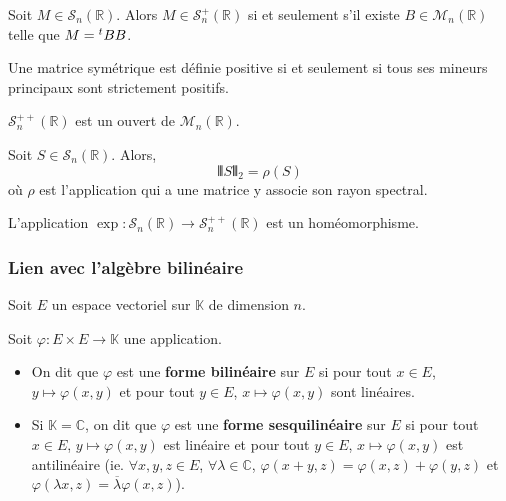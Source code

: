   \begin{corollary}
    Soit $M \in \mathcal{S}_n(\mathbb{R})$. Alors $M \in \mathcal{S}_n^+(\mathbb{R})$ si et seulement s'il existe $B \in \mathcal{M}_n(\mathbb{R})$ telle que $M = \mathstrut ^t BB$.
  \end{corollary}

  \begin{theorem}
    Une matrice symétrique est définie positive si et seulement si tous ses mineurs principaux sont strictement positifs.
  \end{theorem}

  \begin{corollary}
    $\mathcal{S}_n^{++}(\mathbb{R})$ est un ouvert de $\mathcal{M}_n(\mathbb{R})$.
  \end{corollary}


  \begin{lemma}
    Soit $S \in \mathcal{S}_n(\mathbb{R})$. Alors,
    \[ \VERT S \VERT_2 = \rho(S) \]
    où $\rho$ est l'application qui a une matrice y associe son rayon spectral.
  \end{lemma}


  \begin{theorem}
    L'application $\exp : \mathcal{S}_n(\mathbb{R}) \rightarrow \mathcal{S}^{++}_n(\mathbb{R})$ est un homéomorphisme.
  \end{theorem}

  \subsubsection{Lien avec l'algèbre bilinéaire}


  Soit $E$ un espace vectoriel sur $\mathbb{K}$ de dimension $n$.

  \begin{definition}
    Soit $\varphi : E \times E \rightarrow \mathbb{K}$ une application.
    \begin{itemize}
      \item On dit que $\varphi$ est une \textbf{forme bilinéaire} sur $E$ si pour tout $x \in E$, $y \mapsto \varphi(x, y)$ et pour tout $y \in E$, $x \mapsto \varphi(x, y)$ sont linéaires.
      \item Si $\mathbb{K} = \mathbb{C}$, on dit que $\varphi$ est une \textbf{forme sesquilinéaire} sur $E$ si pour tout $x \in E$, $y \mapsto \varphi(x, y)$ est linéaire et pour tout $y \in E$, $x \mapsto \varphi(x, y)$ est antilinéaire (ie. $\forall x, y, z \in E$, $\forall \lambda \in \mathbb{C}$, $\varphi(x+y, z) = \varphi(x,z) + \varphi(y,z)$ et $\varphi(\lambda x, z) = \overline{\lambda} \varphi(x,z)$).
    \end{itemize}
  \end{definition}

